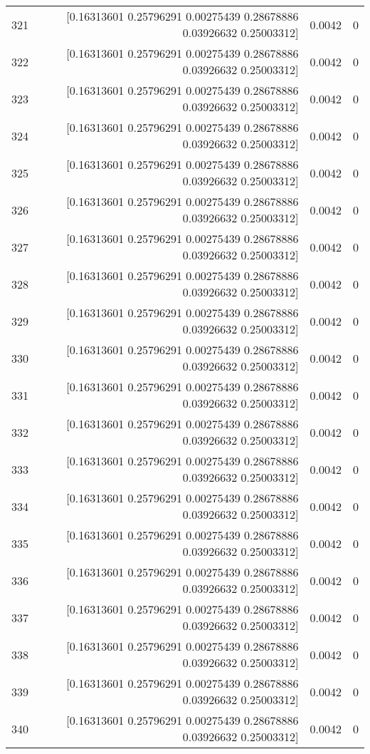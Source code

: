 \begin{longtable}{lrrr}
321 & [0.16313601 0.25796291 0.00275439 0.28678886 0.03926632 0.25003312] & 0.0042 & 0 \\
322 & [0.16313601 0.25796291 0.00275439 0.28678886 0.03926632 0.25003312] & 0.0042 & 0 \\
323 & [0.16313601 0.25796291 0.00275439 0.28678886 0.03926632 0.25003312] & 0.0042 & 0 \\
324 & [0.16313601 0.25796291 0.00275439 0.28678886 0.03926632 0.25003312] & 0.0042 & 0 \\
325 & [0.16313601 0.25796291 0.00275439 0.28678886 0.03926632 0.25003312] & 0.0042 & 0 \\
326 & [0.16313601 0.25796291 0.00275439 0.28678886 0.03926632 0.25003312] & 0.0042 & 0 \\
327 & [0.16313601 0.25796291 0.00275439 0.28678886 0.03926632 0.25003312] & 0.0042 & 0 \\
328 & [0.16313601 0.25796291 0.00275439 0.28678886 0.03926632 0.25003312] & 0.0042 & 0 \\
329 & [0.16313601 0.25796291 0.00275439 0.28678886 0.03926632 0.25003312] & 0.0042 & 0 \\
330 & [0.16313601 0.25796291 0.00275439 0.28678886 0.03926632 0.25003312] & 0.0042 & 0 \\
331 & [0.16313601 0.25796291 0.00275439 0.28678886 0.03926632 0.25003312] & 0.0042 & 0 \\
332 & [0.16313601 0.25796291 0.00275439 0.28678886 0.03926632 0.25003312] & 0.0042 & 0 \\
333 & [0.16313601 0.25796291 0.00275439 0.28678886 0.03926632 0.25003312] & 0.0042 & 0 \\
334 & [0.16313601 0.25796291 0.00275439 0.28678886 0.03926632 0.25003312] & 0.0042 & 0 \\
335 & [0.16313601 0.25796291 0.00275439 0.28678886 0.03926632 0.25003312] & 0.0042 & 0 \\
336 & [0.16313601 0.25796291 0.00275439 0.28678886 0.03926632 0.25003312] & 0.0042 & 0 \\
337 & [0.16313601 0.25796291 0.00275439 0.28678886 0.03926632 0.25003312] & 0.0042 & 0 \\
338 & [0.16313601 0.25796291 0.00275439 0.28678886 0.03926632 0.25003312] & 0.0042 & 0 \\
339 & [0.16313601 0.25796291 0.00275439 0.28678886 0.03926632 0.25003312] & 0.0042 & 0 \\
340 & [0.16313601 0.25796291 0.00275439 0.28678886 0.03926632 0.25003312] & 0.0042 & 0 \\

\end{longtable}
